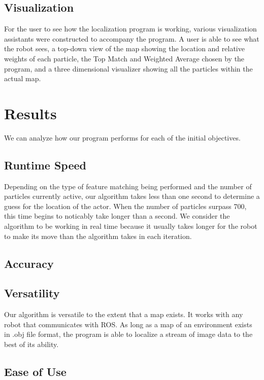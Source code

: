 \documentclass[a4paper,11pt]{article}
\begin{document}
\subsection{Visualization}
For the user to see how the localization program is working, various visualization assistants were constructed to accompany the program. A user is able to see what the robot sees, a top-down view of the map showing the location and relative weights of each particle, the Top Match and Weighted Average chosen by the program, and a three dimensional visualizer showing all the particles within the actual map.

\section{Results}
We can analyze how our program performs for each of the initial objectives.

\subsection{Runtime Speed}
Depending on the type of feature matching being performed and the number of particles currently active, our algorithm takes less than one second to determine a guess for the location of the actor. When the number of particles surpass 700, this time begins to noticably take longer than a second. We consider the algorithm to be working in real time because it usually takes longer for the robot to make its move than the algorithm takes in each iteration.

\subsection{Accuracy}


\subsection{Versatility}
Our algorithm is versatile to the extent that a map exists. It works with any robot that communicates with ROS. As long as a map of an environment exists in .obj file format, the program is able to localize a stream of image data to the best of its ability.

\subsection{Ease of Use}%
\end{document}
